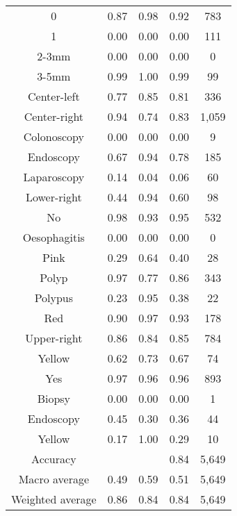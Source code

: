 \begin{center}
\begin{longtable}{|c|c|c|c|c|}
0 &   0.87 &  0.98 &  0.92 &   783 \\
1 &   0.00 &  0.00 &  0.00 &   111 \\
2-3mm &   0.00 &  0.00 &  0.00 &     0 \\
3-5mm &   0.99 &  1.00 &  0.99 &    99 \\
Center-left &   0.77 &  0.85 &  0.81 &   336 \\
Center-right &   0.94 &  0.74 &  0.83 &  1,059 \\
Colonoscopy &   0.00 &  0.00 &  0.00 &     9 \\
Endoscopy &   0.67 &  0.94 &  0.78 &   185 \\
Laparoscopy &   0.14 &  0.04 &  0.06 &    60 \\
Lower-right &   0.44 &  0.94 &  0.60 &    98 \\
No &   0.98 &  0.93 &  0.95 &   532 \\
Oesophagitis &   0.00 &  0.00 &  0.00 &     0 \\
Pink &   0.29 &  0.64 &  0.40 &    28 \\
Polyp &   0.97 &  0.77 &  0.86 &   343 \\
Polypus &   0.23 &  0.95 &  0.38 &    22 \\
Red &   0.90 &  0.97 &  0.93 &   178 \\
Upper-right &   0.86 &  0.84 &  0.85 &   784 \\
Yellow &   0.62 &  0.73 &  0.67 &    74 \\
Yes &   0.97 &  0.96 &  0.96 &   893 \\
Biopsy &   0.00 &  0.00 &  0.00 &     1 \\
Endoscopy &   0.45 &  0.30 &  0.36 &    44 \\
Yellow &   0.17 &  1.00 &  0.29 &    10 \\
\hline
Accuracy &  &   &   0.84 &  5,649 \\
Macro average &   0.49 &  0.59 &  0.51 &  5,649 \\
Weighted average &   0.86 &  0.84 &  0.84 &  5,649 \\
 

\end{longtable}
\end{center}